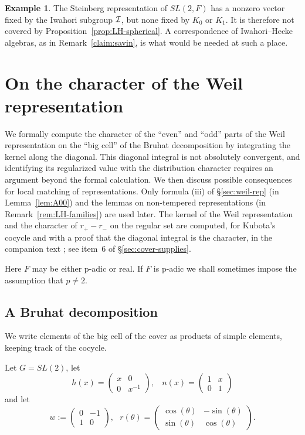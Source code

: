 \documentclass[12pt,letterpaper,openany]{book}
\theoremstyle{plain}
\theoremstyle{definition}
\newtheorem{example}[theorem]{Example}
\theoremstyle{remark}
\theoremstyle{remark}
\begin{document}


\begin{example}
The Steinberg representation of $SL(2,F)$ has a nonzero vector fixed by
the Iwahori subgroup ${\cal I}$, but none fixed by $K_0$ or $K_1$. It is therefore
not covered by Proposition~\ref{prop:LH-spherical}. A correspondence of
Iwahori--Hecke algebras, as in Remark~\ref{claim:savin}, is what would be
needed at such a place.
\end{example}

\section{On the character of the Weil representation}\label{sec:weil}

We formally compute the character of the ``even'' and ``odd'' parts
of the Weil representation on the ``big cell'' of the Bruhat decomposition
by integrating the kernel along the diagonal. This diagonal integral is
not absolutely convergent, and identifying its regularized value with
the distribution character requires an argument beyond the formal
calculation. We then discuss possible consequences for local matching
of representations. Only formula (iii) of \S\ref{sec:weil-rep} (in
Lemma~\ref{lem:A00}) and the lemmas on non-tempered representations (in
Remark~\ref{rem:LH-families}) are used later. The kernel of the Weil
representation and the character of $r_+-r_-$ on the regular set are
computed, for Kubota's cocycle and with a proof that the diagonal
integral is the character, in the companion text \cite{JC}; see item~6
of \S\ref{sec:cover-supplies}.

Here $F$ may be either p-adic or real. If $F$ is p-adic we shall
sometimes impose the assumption that $p\not= 2$.

\subsection{A Bruhat decomposition}

We write elements of the big cell of the cover as products of simple elements, keeping track of the cocycle.


Let $G=SL(2)$, let
\[
h(x)=\left(
\begin{array}{cc}
x & 0 \\
0 & x^{-1}
\end{array}
\right)
,\ \ \ \
n(x)=\left(
\begin{array}{cc}
1 & x \\
0 & 1
\end{array}
\right)
\]
and let
\[
w:=\left(
\begin{array}{cc}
0 & -1 \\
1 & 0
\end{array}
\right),\ \ \
r(\theta )=\left(
\begin{array}{cc}
\cos(\theta) & -\sin(\theta) \\
\sin(\theta) & \cos(\theta)
\end{array}
\right) .
\]
\end{document}

